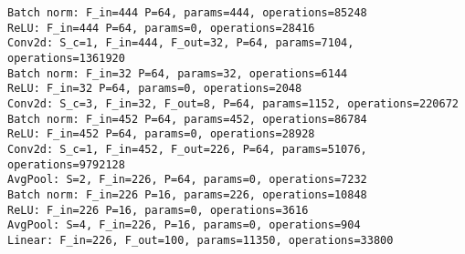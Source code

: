 \begin{Verbatim}[fontsize=\small]
Batch norm: F_in=444 P=64, params=444, operations=85248
ReLU: F_in=444 P=64, params=0, operations=28416
Conv2d: S_c=1, F_in=444, F_out=32, P=64, params=7104, operations=1361920
Batch norm: F_in=32 P=64, params=32, operations=6144
ReLU: F_in=32 P=64, params=0, operations=2048
Conv2d: S_c=3, F_in=32, F_out=8, P=64, params=1152, operations=220672
Batch norm: F_in=452 P=64, params=452, operations=86784
ReLU: F_in=452 P=64, params=0, operations=28928
Conv2d: S_c=1, F_in=452, F_out=226, P=64, params=51076, operations=9792128
AvgPool: S=2, F_in=226, P=64, params=0, operations=7232
Batch norm: F_in=226 P=16, params=226, operations=10848
ReLU: F_in=226 P=16, params=0, operations=3616
AvgPool: S=4, F_in=226, P=16, params=0, operations=904
Linear: F_in=226, F_out=100, params=11350, operations=33800

\end{Verbatim}